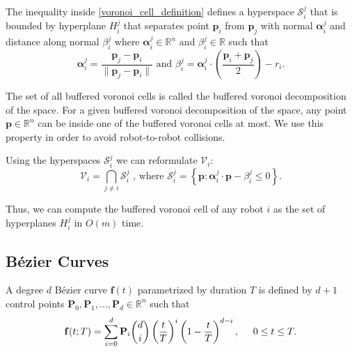 \documentclass{svproc}
\newcommand{\vp}{\mathbf{p}}
\newcommand{\valpha}{\mathbf{\alpha}}
\newcommand{\vP}{\mathbf{P}}
\newcommand{\vf}{\mathbf{f}}
\newcommand{\cV}{\mathcal{V}}
\newcommand{\cS}{\mathcal{S}}
\newcommand{\R}{\mathbb{R}} %
\begin{document}
The inequality inside \eqref{voronoi_cell_definition} defines a hyperspace $\cS_i^j$ that is bounded by hyperplane $H_i^j$ that separates point $\vp_i$ from $\vp_j$ with normal $\valpha_i^j$ and distance along normal $\beta_i^j$ where $\valpha_i^j\in \R^n$ and $\beta_i^j\in \R$ such that
\begin{equation}
    \valpha_i^j = \frac{\vp_j - \vp_i}{\|\vp_j-\vp_i\|} \text{ and }
    \beta_i^j = \valpha_i^j \cdot \left(\frac{\vp_i + \vp_j}{2}\right) - r_i.
    \label{voronoiAlphaBeta}
\end{equation}

The set of all buffered voronoi cells is called the buffered voronoi decomposition of the space.
For a given buffered voronoi decomposition of the space, any point $\vp\in \R^n$ can be inside one of the buffered voronoi cells at most.
We use this property in order to avoid robot-to-robot collisions.

Using the hyperspaces $\cS_i^j$ we can reformulate $\cV_i$:
\begin{equation}
    \cV_i = \bigcap\limits_{j\neq i} \cS_i^j \text{ , where } \cS_i^j = \left\{\vp : \valpha_i^j \cdot \vp - \beta_i^j \leq 0\right\}.
    \label{voronoiEquation}
\end{equation}



Thus, we can compute the buffered voronoi cell of any robot $i$ as the set of hyperplanes $H_i^j$ in $O(m)$ time.

\subsection{B\'ezier Curves} \label{bezierCurves}
A degree $d$ B\'ezier curve $\vf(t)$ parametrized by duration $T$ is defined by $d+1$ control points $\vP_0, \vP_1, ..., \vP_d \in \R^n$ such that
\begin{align}
    \vf(t; T) = \sum_{i=0}^d \vP_i {d\choose i}\left(\frac{t}{T}\right)^i\left(1-\frac{t}{T}\right)^{d-i},\hskip .5cm 0\leq t \leq T.
\end{align}
\end{document}
